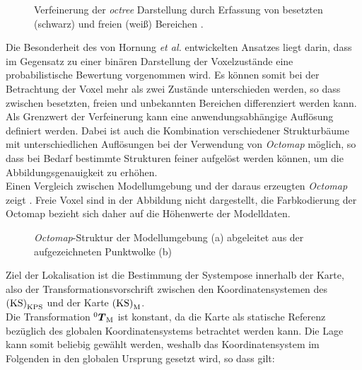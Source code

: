 \begin{figure}[!ht]
	\begin{center}
	\hspace{5mm}
	\caption{Verfeinerung der \textit{octree} Darstellung durch Erfassung von besetzten (schwarz) und freien (weiß) Bereichen \cite{Hornung2013}. }
	\label{fig.octree}
	\end{center}
\end{figure}

Die Besonderheit des von Hornung \textit{et al.} entwickelten Ansatzes liegt darin, dass im Gegensatz zu einer binären Darstellung der Voxelzustände eine probabilistische Bewertung vorgenommen wird. Es können somit bei der Betrachtung der Voxel mehr als zwei Zustände unterschieden werden, so dass zwischen besetzten, freien und unbekannten Bereichen differenziert werden kann. Als Grenzwert der Verfeinerung kann eine anwendungsabhängige Auflösung definiert werden. Dabei ist auch die Kombination verschiedener Strukturbäume mit unterschiedlichen Auflösungen bei der Verwendung von \textit{Octomap} möglich, so dass bei Bedarf bestimmte Strukturen feiner aufgelöst werden können, um die Abbildungsgenauigkeit zu erhöhen.\\
Einen Vergleich zwischen Modellumgebung und der daraus erzeugten \textit{Octomap} zeigt . Freie Voxel sind in der Abbildung nicht dargestellt, die Farbkodierung der Octomap bezieht sich daher auf die Höhenwerte der Modelldaten.\\

\begin{figure}[!ht]
	\begin{center}
	\hspace{5mm}
	\caption{\textit{Octomap}-Struktur der Modellumgebung (a) abgeleitet aus der aufgezeichneten Punktwolke (b)}
	\label{fig.octomap}
	\end{center}
\end{figure}%

Ziel der Lokalisation ist die Bestimmung der Systempose innerhalb der Karte, also der Transformationsvorschrift zwischen den Koordinatensystemen des  ${\mathrm{(KS)}}_{\mathrm{KPS}}$ und der Karte ${\mathrm{(KS)}}_{\mathrm{M}}$.\\
Die Transformation ${^{\mathrm{0}}\mbox{\boldmath{$T$}}_{\mathrm{M}}}$ ist konstant, da die Karte als statische Referenz bezüglich des globalen Koordinatensystems betrachtet werden kann. Die Lage kann somit beliebig gewählt werden, weshalb das Koordinatensystem im Folgenden in den globalen Ursprung gesetzt wird, so dass gilt:

